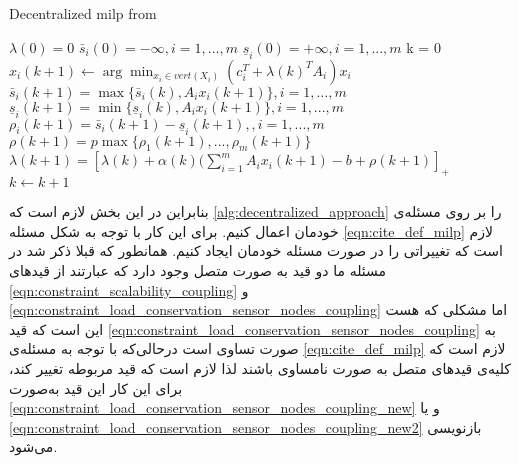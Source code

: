 \begin{latin}
	\begin{algorithm}
		\caption{Decentralized milp from \cite{decentralized_approach}}		          \label{alg:decentralized_approach}
		\begin{algorithmic}[1]
			\Procedure{}{}       %
				\State $\lambda(0) = 0$
				\State $\bar{s}_i(0) = -\infty , i = 1,...,m$ 
				\State $\underline{s}_i(0) = +\infty , i = 1,...,m$ 
				\State k = 0
				\Repeat
						\State $x_i(k+1) \gets \arg \displaystyle \min_{x_i \in vert(X_i)} (c_i^T + \lambda(k)^TA_i)x_i$
					\EndFor
					\State $\bar{s}_i(k+1) = \max\{\bar{s}_i(k), A_ix_i(k+1) \} , i = 1, \dots, m$
					\State $\underline{s}_i(k+1) = \min\{\underline{s}_i(k), A_ix_i(k+1) \} , i = 1,...,m$
					\State $\rho_i(k+1) = \bar{s}_i(k+1) - \underline{s}_i(k+1),  , i = 1,...,m$
					\State $\rho(k+1) = p \max \{ \rho_1(k+1), ..., \rho_m(k+1) \}$
					\State $\lambda(k+1) = [\lambda(k) + \alpha(k)(\sum_{i=1}^{m}A_ix_i(k+1)-b+\rho(k+1)]_+$
					\State $k \gets k+1$ 
			\EndProcedure
		\end{algorithmic}
	\end{algorithm}
\end{latin}
	بنابراین در این بخش لازم است که \cref{alg:decentralized_approach} را بر روی مسئله‌ی خودمان اعمال کنیم. برای این کار با توجه به شکل مسئله \cref{eqn:cite_def_milp} لازم است که تغییراتی را در صورت مسئله خودمان ایجاد کنیم. همانطور که قبلا ذکر شد در مسئله ما دو قید به صورت متصل وجود دارد که عبارتند از قیدهای \cref{eqn:constraint_scalability_coupling} و \cref{eqn:constraint_load_conservation_sensor_nodes_coupling} اما مشکلی که هست این است که قید \cref{eqn:constraint_load_conservation_sensor_nodes_coupling} به صورت تساوی است درحالی‌که با توجه به مسئله‌ی \cref{eqn:cite_def_milp} لازم است که کلیه‌ی قیدهای متصل به صورت نامساوی باشند لذا لازم است که قید مربوطه تغییر کند، برای این کار این قید به‌صورت \cref{eqn:constraint_load_conservation_sensor_nodes_coupling_new} و یا \cref{eqn:constraint_load_conservation_sensor_nodes_coupling_new2} بازنویسی می‌شود. 
	
